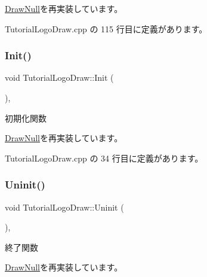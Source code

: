 \mbox{\hyperlink{class_draw_null_a001901c340671106a33d44b9d4aef4c4}{Draw\+Null}}を再実装しています。



 Tutorial\+Logo\+Draw.\+cpp の 115 行目に定義があります。

\mbox{\label{class_tutorial_logo_draw_a53fc4b1b23c7f9e249600be67510f944}} 
\subsubsection{\texorpdfstring{Init()}{Init()}}
{\footnotesize\ttfamily void Tutorial\+Logo\+Draw\+::\+Init (\begin{DoxyParamCaption}{ }\end{DoxyParamCaption})\hspace{0.3cm}{\ttfamily [override]}, {\ttfamily [virtual]}}



初期化関数 



\mbox{\hyperlink{class_draw_null_acd7fef3ccea1da537ac9507ffbb6dd2e}{Draw\+Null}}を再実装しています。



 Tutorial\+Logo\+Draw.\+cpp の 34 行目に定義があります。

\mbox{\label{class_tutorial_logo_draw_a949fb70954e3df28f87b8ed5c61bf8f1}} 
\subsubsection{\texorpdfstring{Uninit()}{Uninit()}}
{\footnotesize\ttfamily void Tutorial\+Logo\+Draw\+::\+Uninit (\begin{DoxyParamCaption}{ }\end{DoxyParamCaption})\hspace{0.3cm}{\ttfamily [override]}, {\ttfamily [virtual]}}



終了関数 



\mbox{\hyperlink{class_draw_null_a12d44e341c7364b5ab9cdd661dc16187}{Draw\+Null}}を再実装しています。



